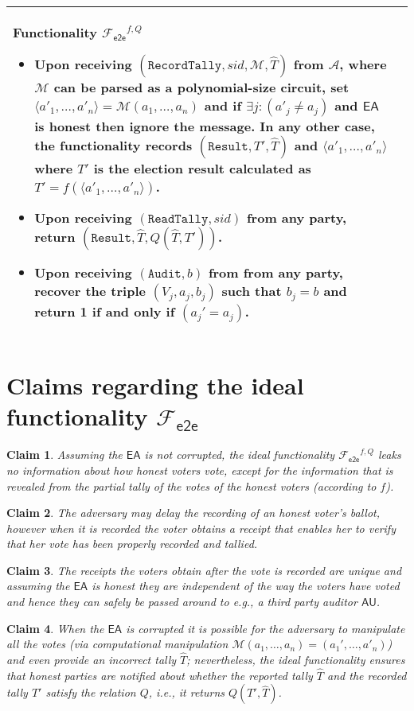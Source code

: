 \documentclass[11pt,letterpaper]{article}
\newenvironment{nffunc}[2][]{
\begin{center}
   \begin{tabular}{|ll|}\hline
     \hspace{.3ex}\begin{minipage}{.99\linewidth}\vspace{0.5ex}
       {\begin{center}{\bf Functionality}
           #2 \end{center}}\vspace{-2ex}%
       }{%
       \vspace{-1ex}
       \smallskip
     \end{minipage}& \\
     \hline
   \end{tabular}
   \end{center}
}
\newcommand{\func}[1][\relax]{\ensuremath{\mathcal{F}_{\mathsf{#1}}}}
\newcommand{\mc}{\mathcal}
\newtheorem{claim}{Claim}
\newcommand{\fete}{\func[e2e]}%
\def\EA{\mathsf{EA}}
\def\AU{\mathsf{AU}}
\def\Audit{\mathtt{Audit}}
\def\RecordTally{\mathtt{RecordTally}}
\def\ReadTally{\mathtt{ReadTally}}
\def\Result{\mathtt{Result}}
\begin{document}
\begin{nffunc}{$\fete^{f,Q}$}
\begin{itemize}
\item Upon receiving $(\RecordTally, sid, \mc{M}, \hat{T})$ from  $\mc{A}$,
where $\mc{M}$ can be parsed as a polynomial-size circuit,
 set $\langle a'_{1}, \ldots, a'_n \rangle = \mc{M}(a_1,\ldots,a_n)$ and if $\exists j: (a'_j \neq a_j)$ and $\EA$ is honest
then ignore the message. In any other case, the functionality records $(\Result, T', \hat{T})$ 
and $\langle a'_{1}, \ldots, a'_n \rangle$
where $T'$ is the election 
result calculated as $T' = f(\langle a'_{1}, \ldots, a'_n \rangle )$. 

\item Upon receiving $(\ReadTally, sid)$ from any party, 
return $(\Result, \hat{T}, Q(\hat{T},T'))$.

\item Upon receiving $(\Audit, b)$ from  from any party, 
recover the triple $(V_j, a_j,b_j)$ such that $b_j = b$ and return 1 if and only 
if $(a_j' = a_j)$.

\end{itemize}
\end{nffunc}


\newpage

\section{Claims regarding the ideal functionality $\fete$}

\begin{claim}
Assuming the $\EA$ is not corrupted, the ideal functionality $\fete^{f,Q}$ leaks no information about 
how honest voters vote, except for the information that is revealed from  
the partial tally  of the votes of the honest voters (according to $f$). 
\end{claim}

\begin{claim}
The adversary may delay the recording of an honest voter's ballot, however when it is
recorded the voter obtains a receipt that enables her to verify that her vote has been
properly recorded and tallied. 
\end{claim}

\begin{claim}
The receipts the voters obtain after the vote is recorded are
unique and assuming the $\EA$ is honest
they are independent of the way the voters have voted
and hence they can safely be passed around to e.g.,  a third
party auditor $\AU$. 
\end{claim}


\begin{claim}
When the $\EA$ is corrupted it is possible for the adversary to manipulate all the votes 
(via computational manipulation $\mc{M}(a_1,\ldots, a_n)  = (a_1', \ldots, a'_n)$)
and even provide an incorrect tally $\hat{T}$; nevertheless, the ideal functionality ensures
that honest parties are notified about whether 
 the reported tally $\hat{T}$ and the recorded tally $T'$ satisfy the relation $Q$,
i.e., it returns $Q(T',\hat{T})$.
\end{claim}
\end{document}
